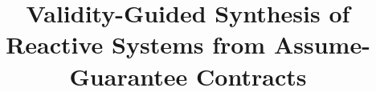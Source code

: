 \documentclass[10pt,conference]{IEEEtran}
\begin{document}
\title{Validity-Guided Synthesis of Reactive Systems from Assume-Guarantee Contracts}

\iffalse
\author{\IEEEauthorblockN{Andreas Katis\IEEEauthorrefmark{1}, Grigory Fedyukovich\IEEEauthorrefmark{2}, Andrew Gacek\IEEEauthorrefmark{3}\\ John
Backes\IEEEauthorrefmark{3}, Arie Gurfinkel\IEEEauthorrefmark{4}, Huajun
Guo\IEEEauthorrefmark{1} and
Michael W. Whalen\IEEEauthorrefmark{1}}
\IEEEauthorblockA{\IEEEauthorrefmark{1}Department of Computer Science and
Engineering,
University of Minnesota\\
Email: \{katis001,guoxx663\}@umn.edu, whalen@cs.umn.edu}
\IEEEauthorblockA{\IEEEauthorrefmark{2}University of Washington Paul G. Allen School of Computer Science \& Engineering\\
Email: grigory@cs.washington.edu}
\IEEEauthorblockA{\IEEEauthorrefmark{3}Rockwell Collins Advanced Technology Center\\
Email: \{andrew.gacek,john.backes\}@rockwellcollins.com}
\IEEEauthorblockA{\IEEEauthorrefmark{4}Department of Electrical and Computer
Engineering, University of Waterloo\\
Email: agurfinkel@uwaterloo.ca}}
\fi 

\author{}


\maketitle
\end{document}
